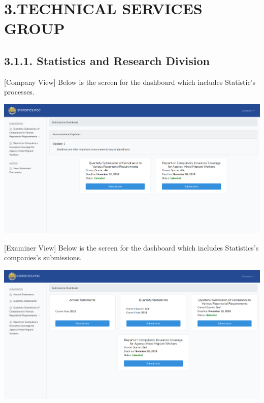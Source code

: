 \documentclass{article}
\begin{document}
\section{3.\hspace*{0.5em}TECHNICAL SERVICES GROUP}\label{sec-technical-services-group}%

\subsection{3.1.\hspace*{0.5em}1.  Statistics and Research Division}\label{sec-1-statistics-and-research-division}%

\noindent{}[Company View] Below is the screen for the dashboard
which includes Statistic’s processes.%

\includegraphics[keepaspectratio=true]{up-ic-screens/image190}{}%

[Examiner View] Below is the screen for the dashboard
which includes Statistics’s companies’s submissions.%

\includegraphics[keepaspectratio=true]{up-ic-screens/image88}{}%
\end{document}
